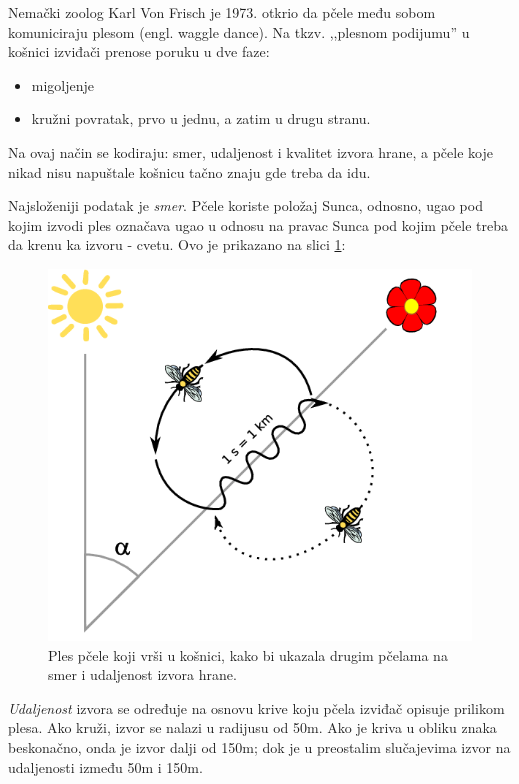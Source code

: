 \documentclass[a4paper]{article}
\begin{document}
{Nemački zoolog Karl Von Frisch je 1973. otkrio da pčele među sobom komuniciraju plesom (engl. waggle dance). Na tkzv. ,,plesnom podijumu'' u košnici izviđači prenose poruku u dve faze:
\begin{itemize}%
\setlength{\labelsep}{10pt}
	\item migoljenje
	\item kružni povratak, prvo u jednu, a zatim u drugu stranu.
\end{itemize}
Na ovaj način se kodiraju: smer, udaljenost i kvalitet izvora hrane, a pčele koje nikad nisu napuštale košnicu tačno znaju gde treba da idu.

Najsloženiji podatak je {\em smer}. Pčele koriste položaj Sunca, odnosno, ugao pod kojim izvodi ples označava ugao u odnosu na pravac Sunca pod kojim pčele treba da krenu ka izvoru - cvetu. Ovo je prikazano na slici \ref{fig:pcela2}:

\begin{figure}[h!]
\begin{center}
\includegraphics[scale=0.35]{waggle_dance.png}
\end{center}
\caption{Ples pčele koji vrši u košnici, kako bi ukazala drugim pčelama na smer i udaljenost izvora hrane.}
\label{fig:pcela2}
\end{figure}

{\em Udaljenost} izvora se određuje na osnovu krive koju pčela izviđač opisuje prilikom plesa. Ako kruži, izvor se nalazi u radijusu od 50m. Ako je kriva u obliku znaka beskonačno, onda je izvor dalji od 150m; dok je u preostalim slučajevima izvor na udaljenosti između 50m i 150m\cite{plespcela}.

}
\end{document}
